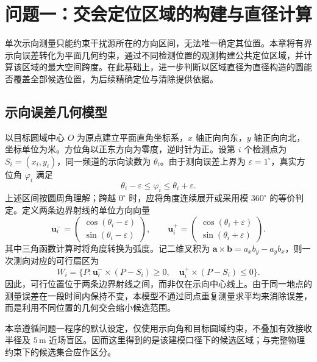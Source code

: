 \section{问题一：交会定位区域的构建与直径计算}
单次示向测量只能约束干扰源所在的方向区间，无法唯一确定其位置。本章将有界示向误差转化为平面几何约束，通过不同检测位置的观测构建公共定位区域，并计算该区域的最大空间跨度。在此基础上，进一步判断以区域直径为直径构造的圆能否覆盖全部候选位置，为后续精确定位与清除提供依据。

\subsection{示向误差几何模型}
以目标圆域中心 $O$ 为原点建立平面直角坐标系，$x$ 轴正向向东，$y$ 轴正向向北，坐标单位为米。方位角以正东方向为零度，逆时针为正。设第 $i$ 个检测点为 $S_i=(x_i,y_i)$，同一频道的示向读数为 $\theta_i$。由于测向误差上界为 $\varepsilon=1^\circ$，真实方位角 $\varphi_i$ 满足
\begin{equation}
 \theta_i-\varepsilon\leq\varphi_i\leq\theta_i+\varepsilon.
\end{equation}
上述区间按圆周角理解；跨越 $0^\circ$ 时，应将角度连续展开或采用模 $360^\circ$ 的等价判定。定义两条边界射线的单位方向向量
\begin{equation}
 \boldsymbol u_i^- = \begin{pmatrix}\cos(\theta_i-\varepsilon)\\\sin(\theta_i-\varepsilon)\end{pmatrix},\qquad
 \boldsymbol u_i^+ = \begin{pmatrix}\cos(\theta_i+\varepsilon)\\\sin(\theta_i+\varepsilon)\end{pmatrix}.
\end{equation}
其中三角函数计算时将角度转换为弧度。记二维叉积为 $\boldsymbol a\times\boldsymbol b=a_xb_y-a_yb_x$，则一次测向对应的可行扇区为
\begin{equation}
 W_i=\{P:\boldsymbol u_i^-\times(P-S_i)\geq0,\quad
 \boldsymbol u_i^+\times(P-S_i)\leq0\}.
\end{equation}
因此，可行位置位于两条边界射线之间，而非仅在示向中心线上。由于同一地点的测量误差在一段时间内保持不变，本模型不通过同点重复测量求平均来消除误差，而是利用不同位置的几何交会缩小候选范围。

本章遵循问题一程序的默认设定，仅使用示向角和目标圆域约束，不叠加有效接收半径及 $5\,\mathrm m$ 近场盲区。因而这里得到的是该建模口径下的候选区域；与完整物理约束下的候选集合应作区分。

